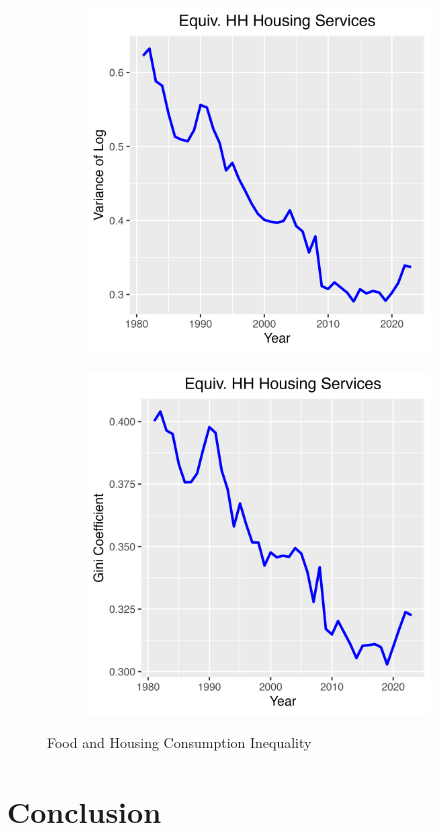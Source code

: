 \documentclass{article}
\begin{document}
\begin{figure}
\begin{subfigure}[t]{0.475\textwidth}
        \label{fig:Food_Gini}
    \end{subfigure}
    \begin{subfigure}[t]{0.475\textwidth}
        \centering
        \includegraphics[width=\textwidth]{figures/Fig_8/Fig_8c_Var_Housing.png}
        \label{fig:Housing_Var}
    \end{subfigure}
    \begin{subfigure}[t]{0.475\textwidth}
        \centering
        \includegraphics[width=\textwidth]{figures/Fig_8/Fig_8d_Gini_Housing.png}
        \label{fig:Housing_Gini}
    \end{subfigure}
    \caption{Food and Housing Consumption Inequality}
    \label{fig:Food_Housing}
\end{figure}


\section{Conclusion}
\label{sec:conclusion}
\end{document}
